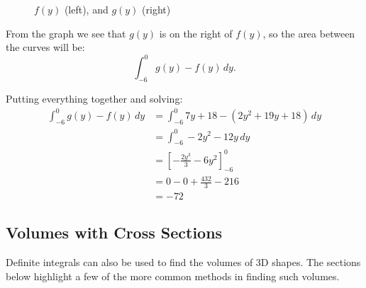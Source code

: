 \documentclass[12pt]{article}
\begin{document}
                \begin{figure}[H]
                    \begin{center}
                        \caption{$f(y)$ (left), and $g(y)$ (right)}
                        \label{fig:abcy1}
                    \end{center}
                \end{figure}

                From the graph we see that $g(y)$ is on the right of $f(y)$, so the area between the curves will be:
                \[ \int_{-6}^0 g(y) - f(y) \, dy. \]

                \noindent Putting everything together and solving:
                \begin{align*}
                    \int_{-6}^0 g(y) - f(y) \, dy &= \int_{-6}^0 7y + 18 - (2y^2 + 19y + 18) \, dy \\
                    &= \int_{-6}^0 -2y^2 - 12y \, dy \\
                    &= \left[ -\frac{2y^3}{3} - 6y^2 \right]_{-6}^0 \\[6pt]
                    &= 0 - 0 + \frac{432}{3} - 216 \\[6pt]
                    &= -72
                \end{align*}

        \subsection{Volumes with Cross Sections}
            Definite integrals can also be used to find the volumes of 3D shapes. The sections below highlight a few of the more common methods in finding such volumes.
\end{document}
